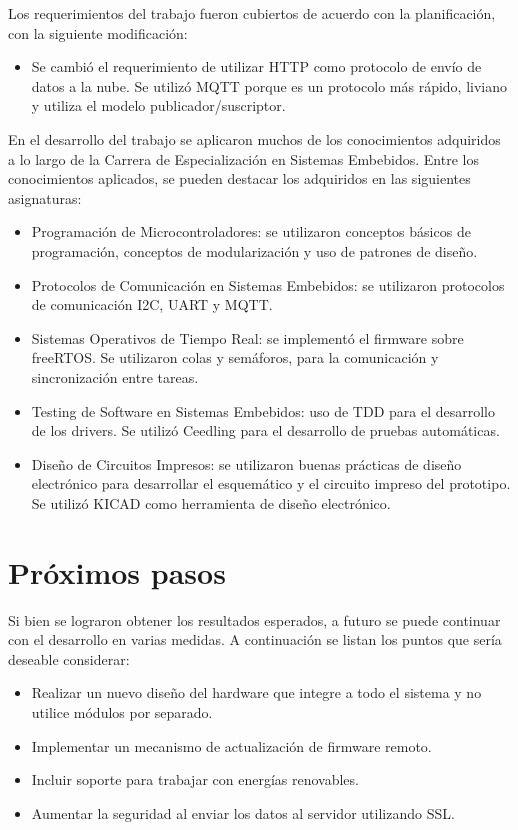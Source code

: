 Los requerimientos del trabajo fueron cubiertos de acuerdo con la planificación, con la siguiente modificación:

\begin{itemize}
    \item Se cambió el requerimiento de utilizar HTTP como protocolo de envío de datos a la nube. Se utilizó MQTT porque es un protocolo más rápido, liviano y utiliza el modelo publicador/suscriptor.
\end{itemize}

En el desarrollo del trabajo se aplicaron muchos de los conocimientos adquiridos a lo largo de la Carrera de Especialización en Sistemas Embebidos. Entre los conocimientos aplicados, se pueden destacar los adquiridos en las siguientes asignaturas:

\begin{itemize}
    \item Programación de Microcontroladores: se utilizaron conceptos básicos de programación, conceptos de modularización y uso de patrones de diseño. 
    \item Protocolos de Comunicación en Sistemas Embebidos: se utilizaron protocolos de comunicación I2C, UART y MQTT.
    \item Sistemas Operativos de Tiempo Real: se implementó el firmware sobre freeRTOS. Se utilizaron colas y semáforos, para la comunicación y sincronización entre tareas.    
    \item Testing de Software en Sistemas Embebidos: uso de TDD para el desarrollo de los drivers. Se utilizó Ceedling para el desarrollo de pruebas automáticas.
    \item Diseño de Circuitos Impresos: se utilizaron buenas prácticas de diseño electrónico para desarrollar el esquemático y el circuito impreso del prototipo. Se utilizó KICAD como herramienta de diseño electrónico.
\end{itemize}

\section{Próximos pasos}

Si bien se lograron obtener los resultados esperados, a futuro se puede continuar
con el desarrollo en varias medidas. A continuación se listan los puntos que sería
deseable considerar:

\begin{itemize}
    \item Realizar un nuevo diseño del hardware que integre a todo el sistema y no utilice módulos por separado.
    \item Implementar un mecanismo de actualización de firmware remoto.
    \item Incluir soporte para trabajar con energías renovables.
    \item Aumentar la seguridad al enviar los datos al servidor utilizando SSL.
\end{itemize}
